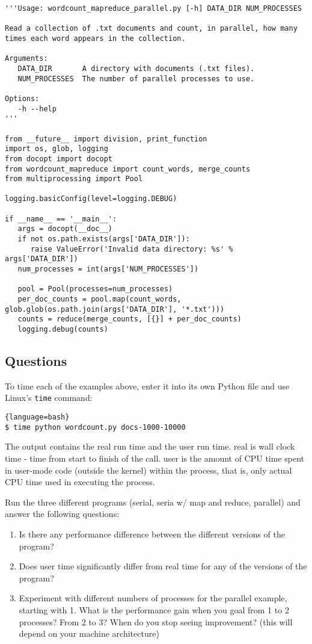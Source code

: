 \begin{lstlisting}
'''Usage: wordcount_mapreduce_parallel.py [-h] DATA_DIR NUM_PROCESSES

Read a collection of .txt documents and count, in parallel, how many
times each word appears in the collection.

Arguments:
   DATA_DIR       A directory with documents (.txt files).
   NUM_PROCESSES  The number of parallel processes to use.

Options:
   -h --help
'''

from __future__ import division, print_function
import os, glob, logging
from docopt import docopt
from wordcount_mapreduce import count_words, merge_counts
from multiprocessing import Pool

logging.basicConfig(level=logging.DEBUG)

if __name__ == '__main__':
   args = docopt(__doc__)
   if not os.path.exists(args['DATA_DIR']):
      raise ValueError('Invalid data directory: %s' % args['DATA_DIR'])
   num_processes = int(args['NUM_PROCESSES'])

   pool = Pool(processes=num_processes)
   per_doc_counts = pool.map(count_words, glob.glob(os.path.join(args['DATA_DIR'], '*.txt')))
   counts = reduce(merge_counts, [{}] + per_doc_counts)
   logging.debug(counts)
\end{lstlisting}

\subsection{Questions}

To time each of the examples above, enter it into its own Python file
and use Linux's \texttt{time} command:


\begin{lstlisting}{language=bash}
$ time python wordcount.py docs-1000-10000
\end{lstlisting}

The output contains the real run time and the user run time. real is
wall clock time - time from start to finish of the call. user is the
amount of CPU time spent in user-mode code (outside the kernel) within
the process, that is, only actual CPU time used in executing the
process.

Run the three different programs (serial, seria w/ map and reduce,
parallel) and answer the following questions:

\begin{enumerate}
\item
  Is there any performance difference between the different versions of
  the program?
\item
  Does user time significantly differ from real time for any of the
  versions of the program?
\item
  Experiment with different numbers of processes for the parallel
  example, starting with 1. What is the performance gain when you goal
  from 1 to 2 processes? From 2 to 3? When do you stop seeing
  improvement? (this will depend on your machine architecture)
\end{enumerate}

